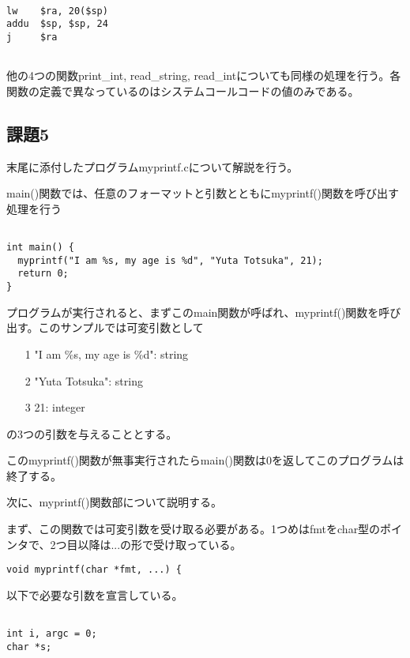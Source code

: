 \documentclass[a4j]{jarticle}
\begin{document}
{\baselineskip 3mm
  \begin{verbatim}

lw    $ra, 20($sp)
addu  $sp, $sp, 24
j     $ra


  \end{verbatim}
}

他の4つの関数print\_int, read\_string, read\_intについても同様の処理を行う。各関数の定義で異なっているのはシステムコールコードの値のみである。



\subsection{課題5}

末尾に添付したプログラムmyprintf.cについて解説を行う。

main()関数では、任意のフォーマットと引数とともにmyprintf()関数を呼び出す処理を行う

{\baselineskip 3mm
  \begin{verbatim}

int main() {
  myprintf("I am %s, my age is %d", "Yuta Totsuka", 21);
  return 0;
}

\end{verbatim}
}

プログラムが実行されると、まずこのmain関数が呼ばれ、myprintf()関数を呼び出す。このサンプルでは可変引数として

\begin{itemize}
\item[1]"I am \%s, my age is \%d": string
\item[2]"Yuta Totsuka": string
\item[3]21: integer
\end{itemize}

の3つの引数を与えることとする。

このmyprintf()関数が無事実行されたらmain()関数は0を返してこのプログラムは終了する。


次に、myprintf()関数部について説明する。

まず、この関数では可変引数を受け取る必要がある。1つめはfmtをchar型のポインタで、2つ目以降は...の形で受け取っている。

\begin{verbatim}
void myprintf(char *fmt, ...) {
\end{verbatim}

以下で必要な引数を宣言している。

{\baselineskip 3mm
  \begin{verbatim}

int i, argc = 0;
char *s;

\end{verbatim}
}
\end{document}
